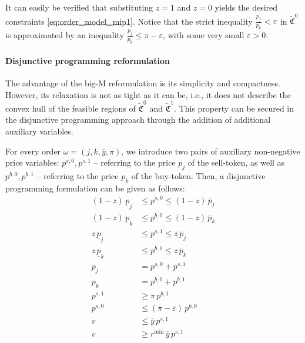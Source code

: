 \documentclass[11pt,parskip=full]{scrartcl}%
\newcommand*{\ie}{i.e., }
\newcommand*{\Min}{\mathrm{min}}
\begin{document}
It can easily be verified that substituting $ z=1 $ and $ z=0 $ yields the desired constraints
\eqref{eq:order_model_mip1}.
Notice that the strict inequality $ \frac{p_j}{p_k} < \pi $ in $ \tilde{\mathfrak{C}}^0 $ is
approximated by an inequality $ \frac{p_j}{p_k} \le \pi - \varepsilon $, with some very small
$ \varepsilon > 0 $.

\paragraph{Disjunctive programming reformulation}

The advantage of the big-M reformulation is its simplicity and compactness.
However, its relaxation is not as tight as it can be, \ie it does not describe the convex hull of
the feasible regions of $ \tilde{\mathfrak{C}}^0 $ and $ \tilde{\mathfrak{C}}^1 $.
This property can be secured in the disjunctive programming approach through the addition of
additional auxiliary variables.

For every order $ \omega = (j,k,\overline{y},\pi) $, we introduce two pairs of auxiliary
non-negative price variables:
$ p^{s,0}, p^{s,1} $ -- referring to the price $ p_j $ of the sell-token, as well as
$ p^{b,0}, p^{b,1} $ -- referring to the price $ p_k $ of the buy-token.
Then, a disjunctive programming formulation can be given as follows:
\begin{subequations}
\begin{align}
  (1-z) \, \underline{p}_j &\le p^{s,0} \le (1-z) \, \overline{p}_j
    \label{eq:mip1_dp_sellprice_0}\\
  (1-z) \, \underline{p}_k &\le p^{b,0} \le (1-z) \, \overline{p}_k
    \label{eq:mip1_dp_buyprice_0}\\
  z \, \underline{p}_j &\le p^{s,1} \le z \, \overline{p}_j
    \label{eq:mip1_dp_sellprice_1}\\[2mm]
  z \, \underline{p}_k &\le p^{b,1} \le z \, \overline{p}_k
    \label{eq:mip1_dp_buyprice_1}\\
  p_j &= p^{s,0} + p^{s,1}
    \label{eq:mip1_dp_sellprice_aggr}\\
  p_k &= p^{b,0} + p^{b,1}
    \label{eq:mip1_dp_buyprice_aggr}\\[2mm]
  p^{s,1} &\ge \pi \, p^{b,1}
    \label{eq:mip1_dp_xrate_1}\\
  p^{s,0} &\le (\pi-\varepsilon) \, p^{b,0}
    \label{eq:mip1_dp_xrate_0}\\[2mm]
  v &\le \overline{y} \, p^{s,1}
    \label{eq:mip1_dp_volume_sell_ub}\\
  v &\ge r^\Min \, \overline{y} \, p^{s,1}
    \label{eq:mip1_dp_volume_sell_lb}
\end{align}
\label{eq:order_model_mip1_DP}
\end{subequations}
\end{document}
